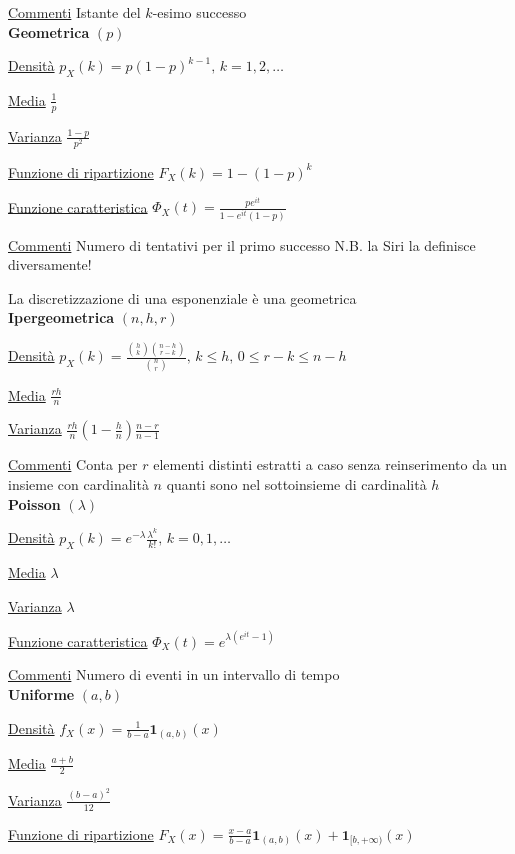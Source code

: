 \documentclass[openany]{book} %
\begin{document}
\begin{multicols}{2}
\underline{Commenti} Istante del $k$-esimo successo
\\

\textbf{Geometrica} $(p)$

\underline{Densità} $p_X(k) = p(1-p)^{k-1}, \, k =1,2,\dots$

\underline{Media} $\frac{1}{p}$

\underline{Varianza} $\frac{1-p}{p^2}$

\underline{Funzione di ripartizione} $F_X(k)=1-(1-p)^k$

\underline{Funzione caratteristica} $\Phi_X(t)= \frac{pe^{it}}{1-e^{it}(1-p)}$

\underline{Commenti} Numero di tentativi per il primo successo N.B. la Siri la definisce diversamente! 

La discretizzazione di una esponenziale è una geometrica
\\

\textbf{Ipergeometrica} $(n,h,r)$

\underline{Densità} $p_X(k) = \frac{\binom {h}{k}\binom {n-h}{r-k}}{\binom {n}{r}},\,k\leq h,\,0\leq r-k\leq n-h$

\underline{Media} $\frac{rh}{n}$

\underline{Varianza} $\frac{rh}{n}\left(1-\frac{h}{n}\right)\frac{n-r}{n-1}$

\underline{Commenti} Conta per $r$ elementi distinti estratti a caso senza reinserimento da un insieme con cardinalità $n$ quanti sono nel sottoinsieme di cardinalità $h$
\\

\textbf{Poisson} $(\lambda)$

\underline{Densità} $p_X(k) = e^{-\lambda}\frac{\lambda^k}{k!},\,k=0,1,\dots$

\underline{Media} $\lambda$

\underline{Varianza} $\lambda$

\underline{Funzione caratteristica} $\Phi_X(t)=e^{\lambda(e^{it}-1)}$

\underline{Commenti} Numero di eventi in un intervallo di tempo
\\

\textbf{Uniforme} $(a,b)$

\underline{Densità} $f_X(x) = \frac{1}{b-a}\boldsymbol{1}_{(a,b)}(x)$

\underline{Media} $\frac{a+b}{2}$

\underline{Varianza} $\frac{(b-a)^2}{12}$

\underline{Funzione di ripartizione} $F_X(x)=\frac{x-a}{b-a}\boldsymbol{1}_{(a,b)}(x)+\boldsymbol{1}_{[b,+\infty)}(x)$


\end{multicols}
\end{document}
